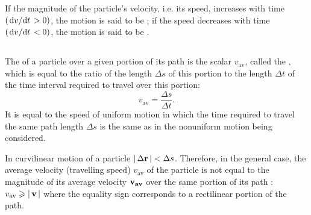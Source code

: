 If the magnitude of the particle's velocity, i.e. its speed, increa­ses with time $(\dv*{v}{t} > 0)$, the motion is said to be ; if the speed decreases with time $(\dv*{v}{t} < 0)$, the motion is said to be .

\subsection{}\label{1.3.5} The  of a particle over a given portion of its path is the scalar $v_{\textrm{av}}$, called the , which is equal to the ratio of the length $\Delta s$ of this portion to the length $\Delta t$ of the time interval required to travel over this portion:
\begin{equation*}%
v_{\textrm{av}} = \frac{\Delta s}{\Delta t}.
\end{equation*}
It is equal to the speed of uniform motion in which the time required to travel the same path length $\Delta s$ is the same as in the nonuniform motion being considered.

In curvilinear motion of a particle $\abs{\, \Delta \vb{r} \, } < \Delta s$. Therefore, in the general case, the average velocity (travelling speed) $v_{\textrm{av}}$ of the particle is not equal to the magnitude of its average velocity $\vb{v_{av}}$ over the same portion of its path : $v_{\textrm{av}} \geqslant \abs{\,\vb{v}\,}$ where the equality sign corresponds to a rectilinear portion of the path.

